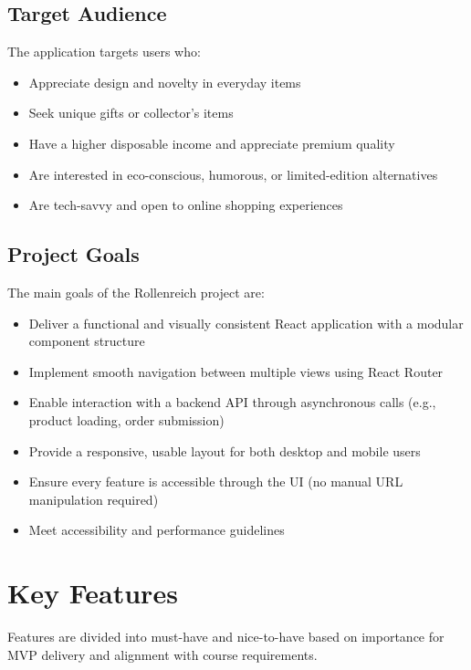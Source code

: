 \documentclass[a4paper,11pt]{article}
\begin{document}
\subsection{Target Audience}
The application targets users who:
\begin{itemize}
    \item Appreciate design and novelty in everyday items
    \item Seek unique gifts or collector’s items
    \item Have a higher disposable income and appreciate premium quality
    \item Are interested in eco-conscious, humorous, or limited-edition alternatives
    \item Are tech-savvy and open to online shopping experiences
\end{itemize}

\subsection{Project Goals}
The main goals of the Rollenreich project are:
\begin{itemize}
    \item Deliver a functional and visually consistent React application with a modular component structure
    \item Implement smooth navigation between multiple views using React Router
    \item Enable interaction with a backend API through asynchronous calls (e.g., product loading, order submission)
    \item Provide a responsive, usable layout for both desktop and mobile users
    \item Ensure every feature is accessible through the UI (no manual URL manipulation required)
    \item Meet accessibility and performance guidelines
\end{itemize}

\section{Key Features}
Features are divided into must-have and nice-to-have based on importance for MVP delivery and alignment with course requirements.
\end{document}
